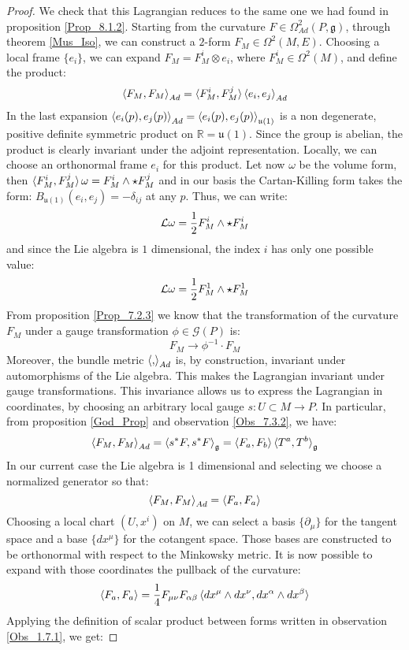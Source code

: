 \documentclass[12pt,a4paper]{report}
\theoremstyle{definition}
\theoremstyle{Theorem}
\theoremstyle{definition}
\theoremstyle{definition}
\begin{document}
	\begin{proof}
		We check that this Lagrangian reduces to the same one we had found in proposition \ref{Prop_8.1.2}. Starting from the curvature $F\in \Omega^2_{Ad}(P,\mathfrak{g})$, through theorem \ref{Mus_Iso}, we can construct a $2$-form $F_M\in \Omega^2(M,E)$. Choosing a local frame $\{e_i\}$, we can expand $F_M=F^i_{M}\otimes e_i$, where $F_M^i\in \Omega^2(M)$, and define the product: $$\braket{F_M,F_M}_{Ad}=\braket{F_M^i,F_M^j}\braket{e_i,e_j}_{Ad}$$
		In the last expansion $\braket{e_i(p),e_j(p)}_{Ad}=\braket{e_i(p),e_j(p)}_{\mathfrak{u}(1)}$ is a non degenerate, positive definite symmetric product on $\mathbb{R}=\mathfrak{u}(1)$. Since the group is abelian, the product is clearly invariant under the adjoint representation. Locally, we can choose an orthonormal frame $e_i$ for this product. Let now $\omega$ be the volume form, then $\braket{F_M^i,F_M^j}\omega=F_M^i\wedge\star F_M^j$ and in our basis the Cartan-Killing form takes the form: $B_{\mathfrak{u}(1)}(e_i,e_j)=-\delta_{ij}$ at any $p$. Thus, we can write:
		$$\mathcal{L}\omega={1\over 2}F_M^i\wedge \star F_M^i$$
		and since the Lie algebra is $1$ dimensional, the index $i$ has only one possible value:
		$$\mathcal{L}\omega={1\over 2}F^1_M\wedge \star F^1_M$$
		From proposition \ref{Prop_7.2.3} we know that the transformation of the curvature $F_M$ under a gauge transformation $\phi\in \mathcal{G}(P)$ is:
		$$F_M\rightarrow \phi^{-1}\cdot F_M$$
		Moreover, the bundle metric $\braket{,}_{Ad}$ is, by construction, invariant under automorphisms of the Lie algebra. This makes the Lagrangian invariant under gauge transformations. This invariance allows us to express the Lagrangian in coordinates, by choosing an arbitrary local gauge $s:U\subset M\rightarrow P$. In particular, from proposition \ref{God_Prop} and observation \ref{Obs_7.3.2}, we have:
		$$\braket{F_M,F_M}_{Ad}=\braket{s^*F,s^*F}_\mathfrak{g}=\braket{F_a,F_b}\braket{T^a,T^b}_\mathfrak{g}$$
		In our current case the Lie algebra is 1 dimensional and selecting we choose a normalized generator so that:
		$$\braket{F_M,F_M}_{Ad}=\braket{F_a,F_a}$$
		Choosing a local chart $(U,x^i)$ on $M$, we can select a basis $\{\partial_\mu\}$ for the tangent space and a base $\{dx^\mu\}$ for the cotangent space. Those bases are constructed to be orthonormal with respect to the Minkowsky metric. It is now possible to expand with those coordinates the pullback of the curvature:
		$$\braket{F_a,F_a}={1\over 4}F_{\mu\nu} F_{\alpha\beta}\braket{dx^\mu\wedge dx^\nu,dx^\alpha\wedge dx^\beta}$$ 
		Applying the definition of scalar product between forms written in observation \ref{Obs_1.7.1}, we get:

\end{proof}
\end{document}
